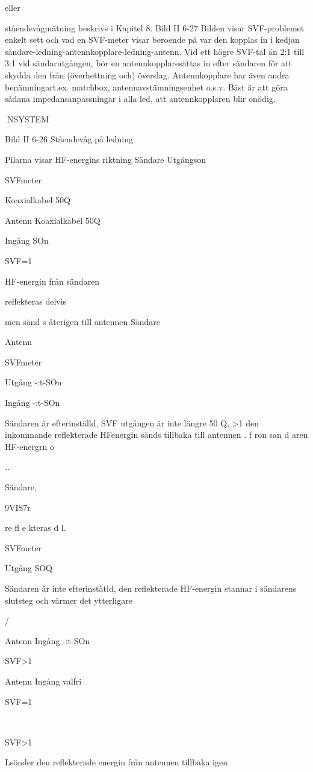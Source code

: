 {{eller

ståendevågmätning beskrivs i Kapitel 8.
Bild II 6-27
Bilden visar SVF-problemet enkelt sett
och vad en SVF-meter visar beroende på
var den kopplas in i kedjan sändare-ledning-antennkopplare-ledning-antenn.
Vid ett högre SVF-tal än 2:1 till 3:1 vid
sändarutgången, bör en antennkopplaresättas in efter sändaren för att skydda den från
(överhettning och) överslag. Antennkopplare har även andra benämningart.ex. matchbox, antennavstämningsenhet o.s.v. Bäst
är att göra sådana impedansanpassningar i
alla led, att antennkopplaren blir onödig.

NSYSTEM

Bild II 6-26 Ståendevåg på ledning

Pilarna visar HF-energins riktning
Sändare
Utgångson

SVFmeter

Koaxialkabel 50Q

Antenn
Koaxialkabel 50Q

Ingång SOn

SVF=1

HF-energin från sändaren

reflekteras delvis

men sänd s återigen till antennen
Sändare

Antenn

SVFmeter

Utgång
-:t-SOn

Ingång
-:t-SOn

Sändaren är efterinställd,
SVF
utgången är inte längre 50 Q,
>1
den inkommande reflekterade HFenergin sänds tillbaka till antennen
. f ron san d aren
HF-energrn
o

..

Sändare,\

9VIS7r

re fl e kteras d l.

SVFmeter

Utgång SOQ

Sändaren är inte efterinstätld,
den reflekterade HF-energin
stannar i sändarens slutsteg
och värmer det ytterligare

/

Antenn
Ingång
-:t-SOn

SVF>1

Antenn
Ingång
valfri

SVF=1

~

SVF>1

Lsönder den reflekterade energin
från antennen tillbaka igen

}}
